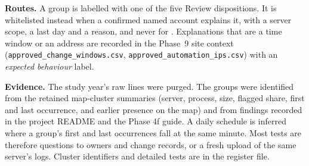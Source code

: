 \documentclass[11pt,a4paper]{article}
\newcommand{\tok}[1]{\texttt{\detokenize{#1}}}
\begin{document}
\textbf{Routes.} A group is labelled with one of the five Review dispositions. It is whitelisted instead when a confirmed named account explains it, with a server scope, a last day and a reason, and never for \tok{root}. Explanations that are a time window or an address are recorded in the Phase~9 site context (\nolinkurl{approved_change_windows.csv}, \nolinkurl{approved_automation_ips.csv}) with an \emph{expected behaviour} label.

\textbf{Evidence.} The study year's raw lines were purged. The groups were identified from the retained map-cluster summaries (server, process, size, flagged share, first and last occurrence, and earlier presence on the map) and from findings recorded in the project README and the Phase 4f guide. A daily schedule is inferred where a group's first and last occurrences fall at the same minute. Most tests are therefore questions to owners and change records, or a fresh upload of the same server's logs. Cluster identifiers and detailed tests are in the register file.
\end{document}
